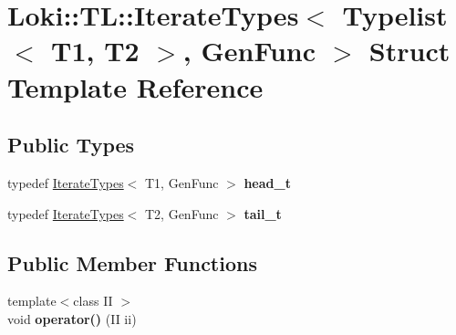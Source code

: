 \hypertarget{structLoki_1_1TL_1_1IterateTypes_3_01Typelist_3_01T1_00_01T2_01_4_00_01GenFunc_01_4}{}\section{Loki\+:\+:T\+L\+:\+:Iterate\+Types$<$ Typelist$<$ T1, T2 $>$, Gen\+Func $>$ Struct Template Reference}
\label{structLoki_1_1TL_1_1IterateTypes_3_01Typelist_3_01T1_00_01T2_01_4_00_01GenFunc_01_4}
\subsection*{Public Types}
\begin{DoxyCompactItemize}
\item 
\hypertarget{structLoki_1_1TL_1_1IterateTypes_3_01Typelist_3_01T1_00_01T2_01_4_00_01GenFunc_01_4_a23d981ad4ecdb24e2d7ea68a67e2a4f4}{}typedef \hyperlink{structLoki_1_1TL_1_1IterateTypes}{Iterate\+Types}$<$ T1, Gen\+Func $>$ {\bfseries head\+\_\+t}\label{structLoki_1_1TL_1_1IterateTypes_3_01Typelist_3_01T1_00_01T2_01_4_00_01GenFunc_01_4_a23d981ad4ecdb24e2d7ea68a67e2a4f4}

\item 
\hypertarget{structLoki_1_1TL_1_1IterateTypes_3_01Typelist_3_01T1_00_01T2_01_4_00_01GenFunc_01_4_a9eff699af4d054ee7f015427a3dcfc3c}{}typedef \hyperlink{structLoki_1_1TL_1_1IterateTypes}{Iterate\+Types}$<$ T2, Gen\+Func $>$ {\bfseries tail\+\_\+t}\label{structLoki_1_1TL_1_1IterateTypes_3_01Typelist_3_01T1_00_01T2_01_4_00_01GenFunc_01_4_a9eff699af4d054ee7f015427a3dcfc3c}

\end{DoxyCompactItemize}
\subsection*{Public Member Functions}
\begin{DoxyCompactItemize}
\item 
\hypertarget{structLoki_1_1TL_1_1IterateTypes_3_01Typelist_3_01T1_00_01T2_01_4_00_01GenFunc_01_4_a1745b4a9b85c65256af74167cbe41447}{}{\footnotesize template$<$class I\+I $>$ }\\void {\bfseries operator()} (I\+I ii)\label{structLoki_1_1TL_1_1IterateTypes_3_01Typelist_3_01T1_00_01T2_01_4_00_01GenFunc_01_4_a1745b4a9b85c65256af74167cbe41447}

\end{DoxyCompactItemize}
